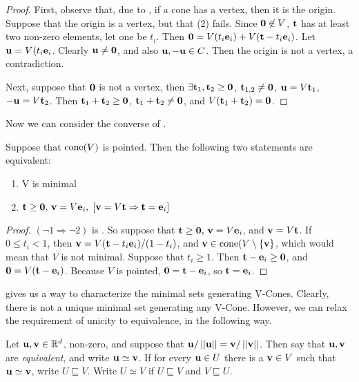 \begin{proof}
  First, observe that, due to , if a cone has a vertex, then it is the origin.  Suppose that the origin is a vertex, but that (2) fails.  Since $\mathbf{0}\not\in V$, $\mathbf{t}$ has at least two non-zero elements, let one be $t_i$.  Then $\mathbf{0} = V(t_i\mathbf{e}_i) + V(\mathbf{t}-t_i\mathbf{e}_i)$.  Let $\mathbf{u}=V(t_i\mathbf{e}_i$.  Clearly $\mathbf{u}\neq\mathbf{0}$, and also $\mathbf{u},-\mathbf{u}\in C$.  Then the origin is not a vertex, a contradiction.  
  
  Next, suppose that $\mathbf{0}$ is not a vertex, then $\exists\mathbf{t}_1,\mathbf{t}_2\geq\mathbf{0}$, $\mathbf{t}_{1,2}\neq\mathbf{0}$, $\mathbf{u}=V\mathbf{t}_1$, $-\mathbf{u}=V\mathbf{t}_2$.  Then $\mathbf{t}_1+\mathbf{t}_2\geq\mathbf{0}$, $\mathbf{t}_1+\mathbf{t}_2\neq\mathbf{0}$, and $V(\mathbf{t}_1+\mathbf{t}_2)=\mathbf{0}$.
\end{proof}

Now we can consider the converse of .

\begin{Prop}\label{min_vcone_generators}
  Suppose that $\operatorname{cone}(V)$ is pointed.  Then the following two statements are equivalent:
  \begin{enumerate}
    \item V is minimal
    \item $\mathbf{t}\geq\mathbf{0},\,\mathbf{v}=V\mathbf{e}_i,\; [\mathbf{v}=V\mathbf{t} \Rightarrow \mathbf{t}=\mathbf{e}_i]$
  \end{enumerate}
\end{Prop}

\begin{proof}
  $(\neg 1 \Rightarrow \neg 2)$ is .  So suppose that $\mathbf{t}\geq\mathbf{0},\,\mathbf{v}=V\mathbf{e}_i$, and $\mathbf{v}=V\mathbf{t}$.  If $0\leq t_i < 1$, then $\mathbf{v} = V(\mathbf{t}-t_i\mathbf{e}_i)/(1-t_i)$, and $\mathbf{v}\in \operatorname{cone}(V\setminus\{\mathbf{v}\} $, which would mean that $V$ is not minimal.  Suppose that $t_i\geq 1$.  Then $\mathbf{t}-\mathbf{e}_i\geq\mathbf{0}$, and $\mathbf{0}=V(\mathbf{t}-\mathbf{e}_i)$.  Because $V$ is pointed, $\mathbf{0}=\mathbf{t}-\mathbf{e}_i$, so $\mathbf{t}=\mathbf{e}_i$.
\end{proof}

 gives us a way to characterize the minimal sets generating V-Cones.  Clearly, there is not a unique minimal set generating any V-Cone.  However, we can relax the requirement of unicity to equivalence, in the following way.

\begin{Def}
	Let $\mathbf{u},\mathbf{v} \in \mathbb{R}^d$, non-zero, and suppose that $\mathbf{u}/\left|\left|\mathbf{u}\right|\right| = \mathbf{v}/\left|\left|\mathbf{v}\right|\right|$.  Then say that $\mathbf{u},\mathbf{v}$ are \textit{equivalent}, and write $\mathbf{u} \simeq \mathbf{v}$.  If for every $\mathbf{u}\in U$ there is a $\mathbf{v}\in V$ such that $\mathbf{u}\simeq\mathbf{v}$, write $ U \sqsubseteq V$.  Write $U \simeq V$ if $U \sqsubseteq V$ and $V \sqsubseteq U$.
\end{Def}

